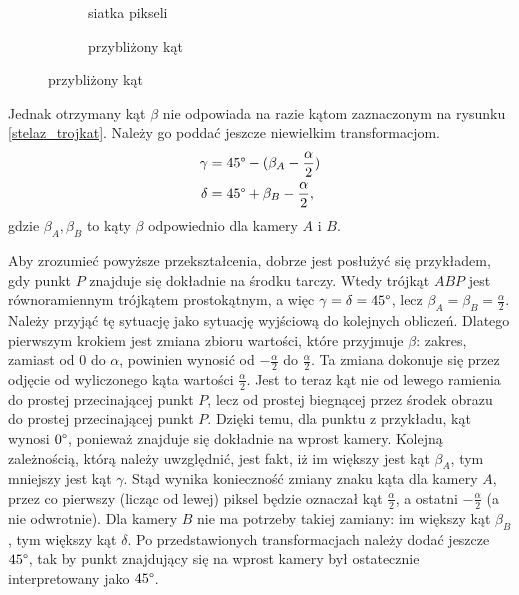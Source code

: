 \begin{figure}[h!]
\centering
\begin{subfigure}{.5\textwidth}
  \centering
  
  \caption{siatka pikseli}
  \label{zdjecie_interpolacja}
\end{subfigure}%
\begin{subfigure}{.5\textwidth}
  \centering
  
  \caption{przybliżony kąt}
  \label{kat_interpolacja}
\end{subfigure}
\end{figure}

Jednak otrzymany kąt $\beta$ nie odpowiada na razie kątom zaznaczonym na rysunku \ref{stelaz_trojkat}. Należy go poddać jeszcze niewielkim transformacjom. 
\begin{align*}
\gamma &=  45\degree - (\beta_A - \frac{\alpha}{2}) \\
\delta &=  45\degree + \beta_B - \frac{\alpha}{2},
\end{align*}
gdzie $\beta_A, \beta_B$ to kąty $\beta$ odpowiednio dla kamery $A$ i $B$.

Aby zrozumieć powyższe przekształcenia, dobrze jest posłużyć się przykładem, gdy punkt $P$ znajduje się dokładnie na środku tarczy. Wtedy trójkąt $ABP$ jest równoramiennym trójkątem prostokątnym, a więc $\gamma = \delta = 45\degree$, lecz $\beta_A = \beta_B = \frac{\alpha}{2}$. Należy przyjąć tę sytuację jako sytuację wyjściową do kolejnych obliczeń. Dlatego pierwszym krokiem jest zmiana zbioru wartości, które przyjmuje $\beta$: zakres, zamiast od $0$ do $\alpha$, powinien wynosić od $-\frac{\alpha}{2}$ do $\frac{\alpha}{2}$. Ta zmiana dokonuje się przez odjęcie od wyliczonego kąta wartości $\frac{\alpha}{2}$. Jest to teraz kąt nie od lewego ramienia do prostej przecinającej punkt $P$, lecz od prostej biegnącej przez środek obrazu do prostej przecinającej punkt $P$. Dzięki temu, dla punktu z przykładu, kąt wynosi $0\degree$, ponieważ znajduje się dokładnie na wprost kamery. Kolejną zależnością, którą należy uwzględnić, jest fakt, iż im większy jest kąt $\beta_A$, tym mniejszy jest kąt $\gamma$. Stąd wynika konieczność zmiany znaku kąta dla kamery $A$, przez co pierwszy (licząc od lewej) piksel będzie oznaczał kąt $\frac{\alpha}{2}$, a ostatni $-\frac{\alpha}{2}$ (a nie odwrotnie). Dla kamery $B$ nie ma potrzeby takiej zamiany: im większy kąt $\beta_B$, tym większy kąt $\delta$. Po przedstawionych transformacjach należy dodać jeszcze $45 \degree$, tak by punkt znajdujący się na wprost kamery był ostatecznie interpretowany jako $45 \degree$.

